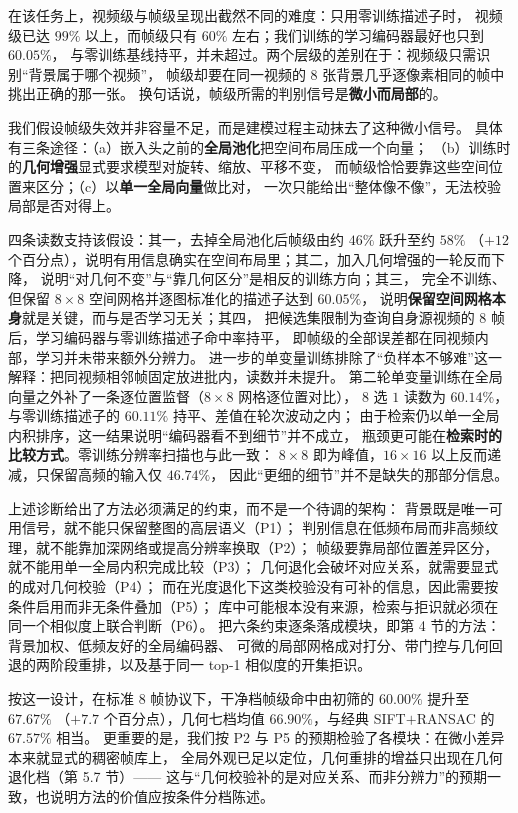 在该任务上，视频级与帧级呈现出截然不同的难度：只用零训练描述子时，
视频级已达 $99\%$ 以上，而帧级只有 $60\%$ 左右；我们训练的学习编码器最好也只到 $60.05\%$，
与零训练基线持平，并未超过。两个层级的差别在于：视频级只需识别“背景属于哪个视频”，
帧级却要在同一视频的 8 张背景几乎逐像素相同的帧中挑出正确的那一张。
换句话说，帧级所需的判别信号是\textbf{微小而局部}的。

我们假设帧级失效并非容量不足，而是建模过程主动抹去了这种微小信号。
具体有三条途径：（a）嵌入头之前的\textbf{全局池化}把空间布局压成一个向量；
（b）训练时的\textbf{几何增强}显式要求模型对旋转、缩放、平移不变，
而帧级恰恰要靠这些空间位置来区分；（c）以\textbf{单一全局向量}做比对，
一次只能给出“整体像不像”，无法校验局部是否对得上。

四条读数支持该假设：其一，去掉全局池化后帧级由约 $46\%$ 跃升至约 $58\%$
（$+12$ 个百分点），说明有用信息确实在空间布局里；其二，加入几何增强的一轮反而下降，
说明“对几何不变”与“靠几何区分”是相反的训练方向；其三，
完全不训练、但保留 $8\times8$ 空间网格并逐图标准化的描述子达到 $60.05\%$，
说明\textbf{保留空间网格本身}就是关键，而与是否学习无关；其四，
把候选集限制为查询自身源视频的 $8$ 帧后，学习编码器与零训练描述子命中率持平，
即帧级的全部误差都在同视频内部，学习并未带来额外分辨力。
进一步的单变量训练排除了“负样本不够难”这一解释：把同视频相邻帧固定放进批内，读数并未提升。
第二轮单变量训练在全局向量之外补了一条逐位置监督（$8\times8$ 网格逐位置对比），
$8$ 选 $1$ 读数为 $60.14\%$，与零训练描述子的 $60.11\%$ 持平、差值在轮次波动之内；
由于检索仍以单一全局内积排序，这一结果说明“编码器看不到细节”并不成立，
瓶颈更可能在\textbf{检索时的比较方式}。零训练分辨率扫描也与此一致：
$8\times8$ 即为峰值，$16\times16$ 以上反而递减，只保留高频的输入仅 $46.74\%$，
因此“更细的细节”并不是缺失的那部分信息。

上述诊断给出了方法必须满足的约束，而不是一个待调的架构：
背景既是唯一可用信号，就不能只保留整图的高层语义（P1）；
判别信息在低频布局而非高频纹理，就不能靠加深网络或提高分辨率换取（P2）；
帧级要靠局部位置差异区分，就不能用单一全局内积完成比较（P3）；
几何退化会破坏对应关系，就需要显式的成对几何校验（P4）；
而在光度退化下这类校验没有可补的信息，因此需要按条件启用而非无条件叠加（P5）；
库中可能根本没有来源，检索与拒识就必须在同一个相似度上联合判断（P6）。
把六条约束逐条落成模块，即第 4 节的方法：背景加权、低频友好的全局编码器、
可微的局部网格成对打分、带门控与几何回退的两阶段重排，以及基于同一 top-1 相似度的开集拒识。

按这一设计，在标准 $8$ 帧协议下，干净档帧级命中由初筛的 $60.00\%$ 提升至 $67.67\%$
（$+7.7$ 个百分点），几何七档均值 $66.90\%$，与经典 SIFT$+$RANSAC 的 $67.57\%$ 相当。
更重要的是，我们按 P2 与 P5 的预期检验了各模块：在微小差异本来就显式的稠密帧库上，
全局外观已足以定位，几何重排的增益只出现在几何退化档（第 5.7 节）——
这与“几何校验补的是对应关系、而非分辨力”的预期一致，也说明方法的价值应按条件分档陈述。

